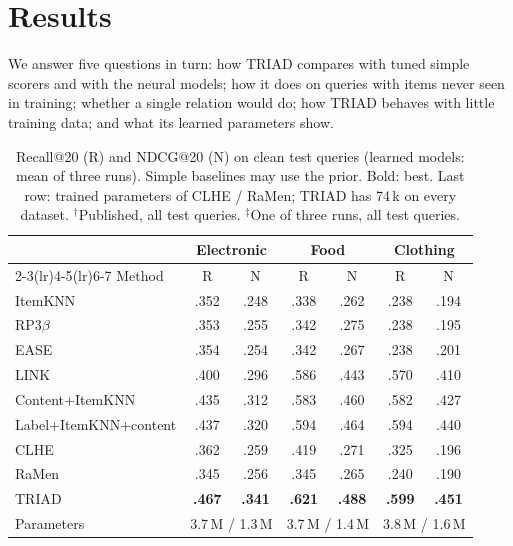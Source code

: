 \documentclass[runningheads]{llncs}
\begin{document}
\section{Results}

We answer five questions in turn: how TRIAD compares with tuned simple scorers and with the neural models; how it
does on queries with items never seen in training; whether a single relation would do; how TRIAD behaves with little training data; and what its learned parameters show.

\begin{table}[t]
\centering
\caption{Recall@20 (R) and NDCG@20 (N) on clean test queries (learned models: mean of three runs). Simple baselines
may use the prior. Bold: best. Last row: trained parameters of CLHE / RaMen; TRIAD has 74\,k on every dataset.
$^\dagger$Published, all test queries. $^\ddagger$One of three runs, all test queries.}
\label{tab:main}
\setlength{\tabcolsep}{3.2pt}
\scriptsize
\begin{tabular}{lcccccc}
\toprule
 & \multicolumn{2}{c}{Electronic} & \multicolumn{2}{c}{Food} & \multicolumn{2}{c}{Clothing}\\
\cmidrule(lr){2-3}\cmidrule(lr){4-5}\cmidrule(lr){6-7}
Method & R & N & R & N & R & N\\
\midrule
ItemKNN & .352 & .248 & .338 & .262 & .238 & .194\\
RP3$\beta$ & .353 & .255 & .342 & .275 & .238 & .195\\
EASE & .354 & .254 & .342 & .267 & .238 & .201\\
LINK & .400 & .296 & .586 & .443 & .570 & .410\\
Content+ItemKNN & .435 & .312 & .583 & .460 & .582 & .427\\
Label+ItemKNN+content & .437 & .320 & .594 & .464 & .594 & .440\\
\midrule
CLHE & .362 & .259 & .419 & .271 & .325 & .196\\
RaMen & .345 & .256 & .345 & .265 & .240 & .190\\
\midrule
TRIAD & \textbf{.467} & \textbf{.341} & \textbf{.621} & \textbf{.488} & \textbf{.599} & \textbf{.451}\\
\midrule
Parameters & \multicolumn{2}{c}{3.7\,M / 1.3\,M} & \multicolumn{2}{c}{3.7\,M / 1.4\,M} & \multicolumn{2}{c}{3.8\,M / 1.6\,M}\\
\bottomrule
\end{tabular}


\end{table}
\end{document}
